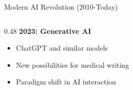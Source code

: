 \documentclass[aspectratio=169, 10pt]{beamer}
\begin{document}
\begin{frame}{Modern AI Revolution (2010-Today)}
\begin{columns}
\begin{column}{0.48\textwidth}
            \vspace{2mm}
            \textbf{2023: Generative AI}
            \begin{itemize}
                \item ChatGPT and similar models
                \item New possibilities for medical writing
                \item Paradigm shift in AI interaction
            \end{itemize}
        \end{column}
    \end{columns}

\end{frame}

\end{document}
